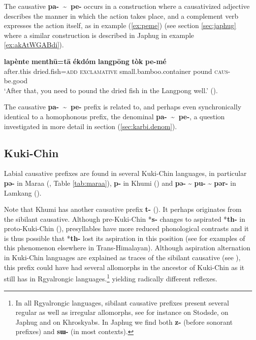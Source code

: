 \documentclass[oneside,a4paper,11pt]{article}
\newcommand{\ipa}[1]{\textbf{{\phon\mbox{#1}}}} %
\newcommand{\refb}[1]{(\ref{#1})}
\newcommand{\tld}{\textasciitilde{}}
\begin{document}
The causative \ipa{pa- \tld{} pe-} occurs in a construction where a causativized adjective describes the manner in which the action takes place, and a complement verb expresses the action itself, as in example \refb{ex:peme} (see section \ref{sec:japhug} where a similar construction is described in Japhug in example \ref{ex:akAtWGABdi}).

\begin{exe}
\ex \label{ex:peme}
\gll 
\ipa{lapènte} 	\ipa{menthū=tā} 	\ipa{ékdóm} 	\ipa{langpōng} 	\ipa{tòk} 	\ipa{pe-mé} \\
after.this dried.fish=\textsc{add} \textsc{exclamative} small.bamboo.container pound \textsc{caus}-be.good\\
\glt `After that, you need to pound the dried fish in the Langpong well.' (\citealt[124]{konnerth14karbi}).
\end{exe}

The causative \ipa{pa- \tld{} pe-} prefix is related to, and perhaps even synchronically identical to a homophonous prefix, the denominal \ipa{pa- \tld{} pe-}, a question investigated in more detail in section \refb{sec:karbi.denom}.

\subsection{Kuki-Chin}  \label{sec:kc}
Labial causative prefixes are found in several Kuki-Chin languages, in particular \ipa{pə-} in Maraa (\citealt[139]{hartmann01prenasalization}, Table \ref{tab:maraa}), \ipa{p-} in Khumi (\citealt[99]{peterson10elaborate}) and \ipa{pə-} \tld{} \ipa{pu-} \tld{} \ipa{pər-} in Lamkang (\citealt[52-4]{chelliah07lamkang}).

Note that Khumi has another causative prefix \ipa{t-} (\citealt[12]{hartmann13valence}). It perhaps originates from the sibilant causative. Although pre-Kuki-Chin *\ipa{s-} changes to aspirated *\ipa{th-} in proto-Kuki-Chin (\citealt[16]{vanbik09pkc}), presyllables have more reduced phonological contrasts and it is thus possible that *\ipa{th-} lost its aspiration in this position (see \citealt{jacques12agreement} for examples of this phenomenon elsewhere in Trans-Himalayan). Although aspiration alternation in Kuki-Chin languages are explained as traces of the sibilant causative (see \citealt[220;259]{vanbik09pkc}), this prefix could have had several allomorphs in the ancestor of Kuki-Chin as it still has in Rgyalrongic languages.\footnote{In all Rgyalrongic languages, sibilant causative prefixes present several regular as well as irregular allomorphs, see for instance \citet{jackson07shangzhai} on Stodsde, \citet{jacques15causative} on Japhug and \citet{lai16caus} on Khroskyabs. In Japhug we find both \ipa{z-} (before sonorant prefixes) and \ipa{sɯ-} (in most contexts).} yielding radically different reflexes.
\end{document}
